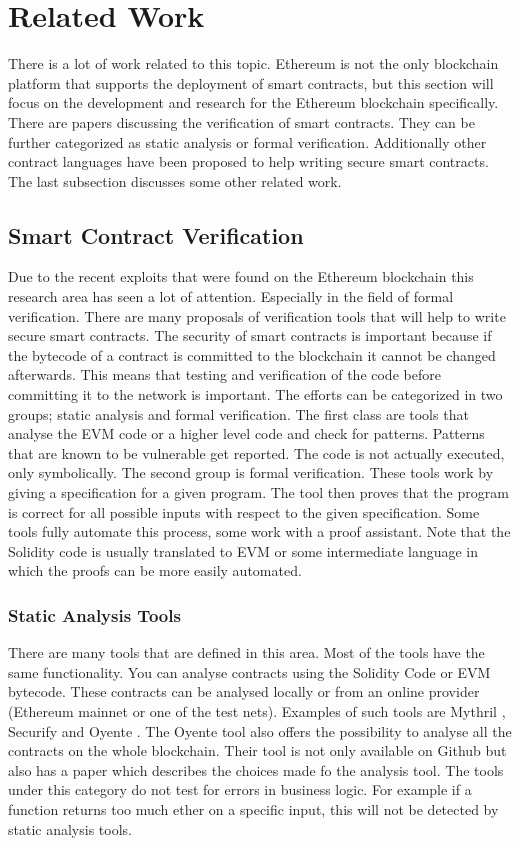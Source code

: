 \documentclass[a4paper]{article}
\begin{document}
\section{Related Work}
\label{sec:RelatedWork}
There is a lot of work related to this topic. Ethereum is not the only blockchain platform that supports the deployment of smart contracts, but this section will focus on the development and research for the Ethereum blockchain specifically. There are papers discussing the verification of smart contracts. They can be further categorized as static analysis or formal verification. Additionally other contract languages have been proposed to help writing secure smart contracts. The last subsection discusses some other related work.

\subsection{Smart Contract Verification}
Due to the recent exploits that were found on the Ethereum blockchain this research area has seen a lot of attention. Especially in the field of formal verification. There are many proposals of verification tools that will help to write secure smart contracts. The security of smart contracts is important because if the bytecode of a contract is committed to the blockchain it cannot be changed afterwards. This means that testing and verification of the code before committing it to the network is important. The efforts can be categorized in two groups; static analysis and formal verification. The first class are tools that analyse the EVM code or a higher level code and check for patterns. Patterns that are known to be vulnerable get reported. The code is not actually executed, only symbolically. The second group is formal verification. These tools work by giving a specification for a given program. The tool then proves that the program is correct for all possible inputs with respect to the given specification. Some tools fully automate this process, some work with a proof assistant. Note that the Solidity code is usually translated to EVM or some intermediate language in which the proofs can be more easily automated.
\subsubsection{Static Analysis Tools}
There are many tools that are defined in this area. Most of the tools have the same functionality. You can analyse contracts using the Solidity Code or EVM bytecode. These contracts can be analysed locally or from an online provider (Ethereum mainnet or one of the test nets). Examples of such tools are Mythril \cite{mythrilrepo}, Securify \cite{securifywebsite} and Oyente \cite{luu2016making}. The Oyente tool also offers the possibility to analyse all the contracts on the whole blockchain. Their tool is not only available on Github but also has a paper which describes the choices made fo the analysis tool. The tools under this category do not test for errors in business logic. For example if a function returns too much ether on a specific input, this will not be detected by static analysis tools. 
\end{document}
